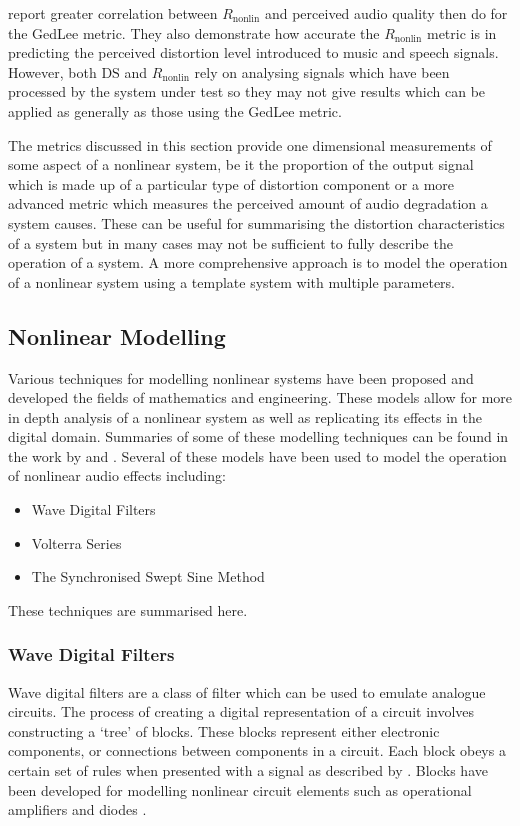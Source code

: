 			\citet{tan2004predicting} report greater correlation between $R_{\mathrm{nonlin}}$ and perceived
			audio quality then \citet{lee2003auditory} do for the GedLee metric. They also demonstrate how
			accurate the $R_{\mathrm{nonlin}}$ metric is in predicting the perceived distortion level
			introduced to music and speech signals. However, both $\mathrm{DS}$ and $R_{\mathrm{nonlin}}$ rely
			on analysing signals which have been processed by the system under test so they may not give
			results which can be applied as generally as those using the GedLee metric.

			The metrics discussed in this section provide one dimensional measurements of some aspect of a
			nonlinear system, be it the proportion of the output signal which is made up of a particular type
			of distortion component or a more advanced metric which measures the perceived amount of audio
			degradation a system causes. These can be useful for summarising the distortion characteristics of
			a system but in many cases may not be sufficient to fully describe the operation of a system. A
			more comprehensive approach is to model the operation of a nonlinear system using a template system
			with multiple parameters.

	\subsection{Nonlinear Modelling}
	\label{sec:Excitation-Analysis-Modelling}
		Various techniques for modelling nonlinear systems have been proposed and developed the fields of
		mathematics and engineering. These models allow for more in depth analysis of a nonlinear system as well as
		replicating its effects in the digital domain. Summaries of some of these modelling techniques can be found
		in the work by \citet{janczak2005identification} and \citet{ogunfunmi2007adaptive}. Several of these models
		have been used to model the operation of nonlinear audio effects including:

		\begin{itemize}
			\item Wave Digital Filters
			\item Volterra Series
			\item The Synchronised Swept Sine Method
		\end{itemize}

		These techniques are summarised here.

		\subsubsection{Wave Digital Filters}
			Wave digital filters are a class of filter which can be used to emulate analogue circuits. The
			process of creating a digital representation of a circuit involves constructing a `tree' of blocks.
			These blocks represent either electronic components, or connections between components in a
			circuit.  Each block obeys a certain set of rules when presented with a signal as described by
			\citet{fettweis1986wave}. Blocks have been developed for modelling nonlinear circuit elements such
			as operational amplifiers and diodes \citep{paiva2012emulation}.

